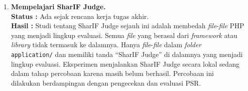 \documentclass[a4paper,twoside]{article}
\begin{document}
	\begin{enumerate}
		\item \textbf{Mempelajari SharIF Judge.}\\
		{\bf Status :} Ada sejak rencana kerja tugas akhir.\\
		{\bf Hasil :} Studi tentang SharIF Judge sejauh ini adalah membedah \textit{file}-\textit{file} PHP yang menjadi lingkup evaluasi. Semua \textit{file} yang berasal dari \textit{framework} atau \textit{library} tidak termasuk ke dalamnya. Hanya \textit{file}-\textit{file} dalam \textit{folder} \verb|application/| dan memiliki tanda ``SharIF Judge'' di dalamnya yang menjadi lingkup evaluasi. Eksperimen menjalankan SharIF Judge secara lokal sedang dalam tahap percobaan karena masih belum berhasil. Percobaan ini dilakukan berdampingan dengan pengecekan dan evaluasi PSR.
		

\end{enumerate}
\end{document}
